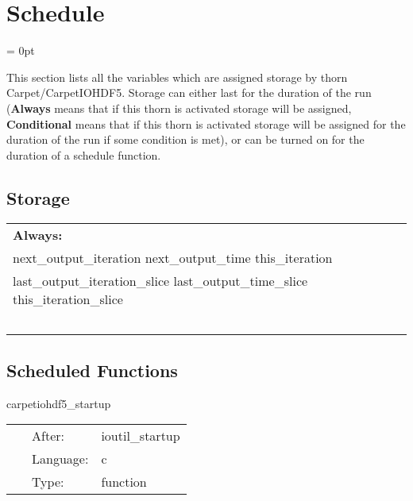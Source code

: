 
\section{Schedule} 


\parskip = 0pt


\noindent This section lists all the variables which are assigned storage by thorn Carpet/CarpetIOHDF5.  Storage can either last for the duration of the run ({\bf Always} means that if this thorn is activated storage will be assigned, {\bf Conditional} means that if this thorn is activated storage will be assigned for the duration of the run if some condition is met), or can be turned on for the duration of a schedule function.


\subsection*{Storage}

\hspace{5mm}

 \begin{tabular*}{160mm}{ll} 

{\bf Always:}&  ~ \\ 
 next\_output\_iteration next\_output\_time this\_iteration & ~\\ 
 last\_output\_iteration\_slice last\_output\_time\_slice this\_iteration\_slice & ~\\ 
~ & ~\\ 
\end{tabular*} 


\subsection*{Scheduled Functions}
\vspace{5mm}


\hspace{5mm} carpetiohdf5\_startup 

\hspace{5mm}{\it startup routine } 


\hspace{5mm}

 \begin{tabular*}{160mm}{cll} 
~ & After:  & ioutil\_startup \\ 
~ & Language:  & c \\ 
~ & Type:  & function \\ 
\end{tabular*} 


